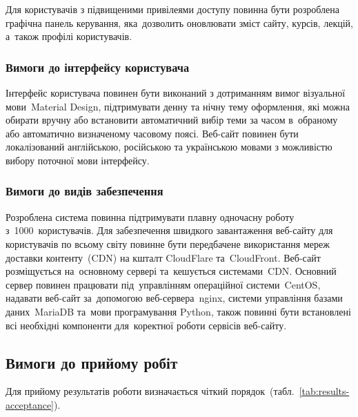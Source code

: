 \documentclass[a4paper,oneside,BCOR=1cm,DIV=12,12pt,headings=normal]{scrartcl}
\newcommand{\allcaps}[1]{{\addfontfeatures{LetterSpace = 3}#1}}
\begin{document}
				Для користувачів з підвищеними привілеями доступу повинна бути розроблена графічна панель керування, яка~дозволить оновлювати зміст сайту, курсів, лекцій, а~також профілі користувачів.

			\subsubsection{Вимоги до інтерфейсу користувача}
				Інтерфейс користувача повинен бути виконаний з дотриманням вимог візуальної мови~Material Design, підтримувати денну та нічну тему оформлення, які можна обирати вручну або встановити автоматичний вибір теми за часом в~обраному або автоматично визначеному часовому поясі. Веб-сайт повинен бути локалізований англійською, російською та українською мовами з можливістю вибору поточної мови інтерфейсу.

			\subsubsection{Вимоги до видів забезпечення}
				Розроблена система повинна підтримувати плавну одночасну роботу з~1000~користувачів. Для забезпечення швидкого завантаження веб-сайту для користувачів по всьому світу повинне бути передбачене використання мереж доставки контенту~(\allcaps{CDN}) на кшталт CloudFlare та~CloudFront. 
				Веб-сайт розміщується на~основному сервері та~кешується системами~\allcaps{CDN}. Основний сервер повинен працювати під~управлінням операційної системи~CentOS, надавати веб-сайт за~допомогою веб-сервера~nginx, системи управління базами даних~MariaDB та~мови програмування Python, також повинні бути встановлені всі необхідні компоненти для~коректної роботи сервісів веб-сайту.

		\subsection{Вимоги до прийому робіт}
			Для прийому результатів роботи визначається чіткий порядок~(табл.~\ref{tab:results-acceptance}).
\end{document}
